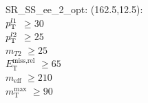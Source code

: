 SR\_SS\_ee\_2\_opt: (162.5,12.5): \\
$p_{\text{T}}^{l1}$ $\geq 30$ \\
$p_{\text{T}}^{l2}$ $\geq 25$ \\
$m_{T2}$ $\geq 25$ \\
$E_{\text{T}}^{\text{miss,rel}}$ $\geq 65$ \\
$m_{\text{eff}}$ $\geq 210$ \\
$m_{\text{T}}^{\text{max}}$ $\geq 90$ \\
